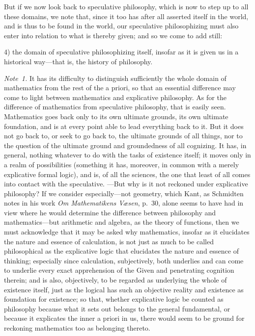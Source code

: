 \documentclass[12pt,a4paper]{book}
\begin{document}
But if we now look back to speculative philosophy, which is now to step up to all
these domains, we note that, since it too has after all asserted itself in the
world, and is thus to be found in the world, our speculative philosophizing must
also enter into relation to what is thereby given; and so we come to add still:

4) the domain of speculative philosophizing itself, insofar as it is given us in a
historical way---that is, the history of philosophy.

{\small\emph{Note~1.} It has its difficulty to distinguish sufficiently the whole
domain of mathematics from the rest of the a priori, so that an essential
difference may come to light between mathematics and explicative philosophy. As
for the difference of mathematics from speculative philosophy, that is easily seen.
Mathematics goes back only to its own ultimate grounds, its own ultimate
foundation, and is at every point able to lead everything back to it. But it does
not go back to, or seek to go back to, the ultimate grounds of all things, nor to
the question of the ultimate ground and groundedness of all cognizing. It has, in
general, nothing whatever to do with the tasks of existence itself; it moves only
in a realm of possibilities (something it has, moreover, in common with a merely
explicative formal logic), and is, of all the sciences, the one that least of all
comes into contact with the speculative. ---But why is it not reckoned under
explicative philosophy? If we consider especially---not geometry, which Kant, as
Schmidten notes in his work \textit{Om Mathematikens Væsen}, p.~30, alone seems to
have had in view where he would determine the difference between philosophy and
mathematics---but arithmetic and algebra, as the theory of functions, then we must
acknowledge that it may be asked why mathematics, insofar as it elucidates the
nature and essence of calculation, is not just as much to be called philosophical
as the explicative logic that elucidates the nature and essence of thinking;
especially since calculation, subjectively, both underlies and can come to
underlie every exact apprehension of the Given and penetrating cognition therein;
and is also, objectively, to be regarded as underlying the whole of existence
itself, just as the logical has such an objective reality and existence as
foundation for existence; so that, whether explicative logic be counted as
philosophy because what it sets out belongs to the general fundamental, or because
it explicates the inner a priori in us, there would seem to be ground for
reckoning mathematics too as belonging thereto.\par}
\end{document}
